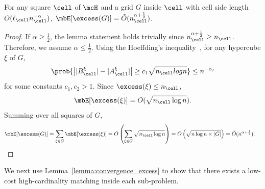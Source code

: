 \begin{lemma}\label{lemma:convergence_excess}
    For any square $\cell$ of $\mcH$ and a grid $G$ inside $\cell$ with cell side length $O(\ell_\cell n_\cell^{-\alpha})$, $\mbE[\excess(G)]= \tilde{O}(n_\cell^{\alpha + \frac{1}{2}})$. 
\end{lemma}
\begin{proof}
    If $\alpha\ge \frac{1}{2}$, the lemma statement holds trivially since $n_\cell^{\alpha+\frac{1}{2}} \ge n_\cell$. Therefore, we assume $\alpha\le \frac{1}{2}$.
    Using the Hoeffding\textquoteright{}s inequality~\cite{hoeffding1994probability}, for any hypercube $\xi$ of $G$,
    \begin{equation*}
        \prob{\big||B_\cell^\xi| - |A_\cell^\xi|\big|\ge c_1\sqrt{n_\cell log n}}\le n^{-c_2}\label{eq:excess}
    \end{equation*}
    for some constants $c_1, c_2 > 1$. Since $\excess(\xi)\le n_\cell$, 
    \begin{equation*}
        \mbE[\excess(\xi)]= O(\sqrt{n_\cell\log n}).\label{eq:excess_cell}
    \end{equation*}
    Summing over all squares of $G$,
    \begin{align*}
        \mbE[\excess(G)] = \sum_{\xi\in G} \mbE[\excess(\xi)] &=O\left(\sum_{\xi\in G} \sqrt{n_\cell\log n}\right) = O\left(\sqrt{n\log n\times |G|}\right) = \tilde{O}(n^{\alpha+\frac{1}{2}}).\label{eq:excess-dense}
    \end{align*}
\end{proof}

We next use Lemma~\ref{lemma:convergence_excess} to show that there exists a low-cost high-cardinality matching inside each sub-problem.

